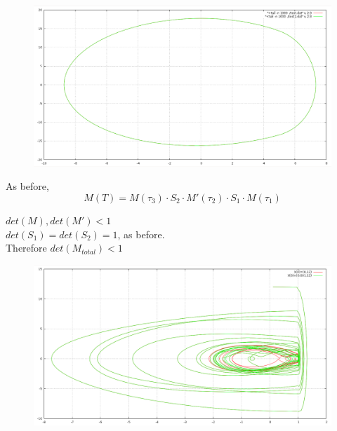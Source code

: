 \documentclass[xcolor=x11names,compress]{beamer}
\renewcommand{\(}{\begin{columns}}
\renewcommand{\)}{\end{columns}}
\newcommand{\<}[1]{\begin{column}{#1}}
\renewcommand{\>}{\end{column}}
\begin{document}
\begin{frame}
\begin{figure}
\begin{center}
\includegraphics[width=0.6\columnwidth]{withdamp}
\end{center}
\end{figure}

As before, 
\[
M(T)= M(\tau_3)\cdot S_2\cdot M'(\tau_2)\cdot S_1\cdot M(\tau_1)
\]

$det(M),det(M')<1$\\
$det(S_1)=det(S_2)=1$, as before.  \\

Therefore $det(M_{total})<1$

\end{frame}


\begin{frame}
\begin{figure}
\begin{center}
\includegraphics[width=0.9\columnwidth]{soft-impact.png}
\end{center}
\end{figure}
\end{frame}
\end{document}
